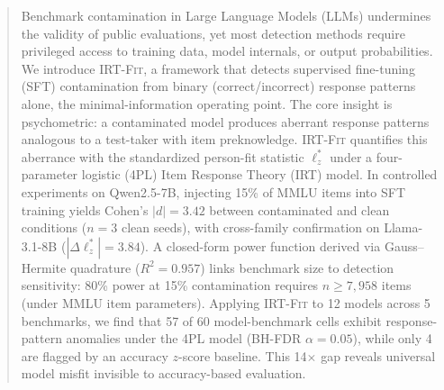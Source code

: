 \begin{abstract}
Benchmark contamination in Large Language Models (LLMs) undermines the validity of public evaluations, yet most detection methods require privileged access to training data, model internals, or output probabilities.
We introduce \textsc{IRT-Fit}, a framework that detects supervised fine-tuning (SFT) contamination from binary (correct/incorrect) response patterns alone, the minimal-information operating point.
The core insight is psychometric: a contaminated model produces aberrant response patterns analogous to a test-taker with item preknowledge.
\textsc{IRT-Fit} quantifies this aberrance with the standardized person-fit statistic $\ell_z^*$ under a four-parameter logistic (4PL) Item Response Theory (IRT) model.
%
In controlled experiments on Qwen2.5-7B, injecting 15\% of MMLU items into SFT training yields Cohen's $|d|=3.42$ between contaminated and clean conditions ($n=3$ clean seeds), with cross-family confirmation on Llama-3.1-8B ($|\Delta\ell_z^*|=3.84$).
A closed-form power function derived via Gauss--Hermite quadrature ($R^2=0.957$) links benchmark size to detection sensitivity: 80\% power at 15\% contamination requires $n \geq 7{,}958$ items (under MMLU item parameters).
Applying \textsc{IRT-Fit} to 12 models across 5 benchmarks, we find that 57 of 60 model-benchmark cells exhibit response-pattern anomalies under the 4PL model (BH-FDR $\alpha=0.05$), while only 4 are flagged by an accuracy $z$-score baseline.
This 14$\times$ gap reveals universal model misfit invisible to accuracy-based evaluation.
\end{abstract}